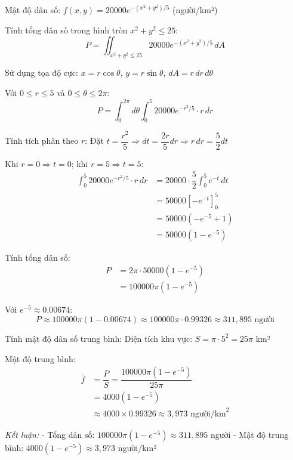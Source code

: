 \begin{solution}
Mật độ dân số: $f(x, y) = 20000e^{-(x^2+y^2)/5}$ (người/km²)

\textit{} Tính tổng dân số trong hình tròn $x^2 + y^2 \leq 25$:
\[
    P = \iint_{x^2+y^2 \leq 25} 20000e^{-(x^2+y^2)/5} \, dA
\]

\textit{} Sử dụng tọa độ cực:
$x = r\cos\theta$, $y = r\sin\theta$, $dA = r \, dr \, d\theta$

Với $0 \leq r \leq 5$ và $0 \leq \theta \leq 2\pi$:
\[
    P = \int_0^{2\pi} d\theta \int_0^5 20000e^{-r^2/5} \cdot r \, dr
\]

\textit{} Tính tích phân theo $r$:
Đặt $t = \dfrac{r^2}{5} \Rightarrow dt = \dfrac{2r}{5} dr \Rightarrow r \, dr = \dfrac{5}{2} dt$

Khi $r = 0 \Rightarrow t = 0$; khi $r = 5 \Rightarrow t = 5$:
\begin{align*}
    \int_0^5 20000e^{-r^2/5} \cdot r \, dr &= 20000 \cdot \dfrac{5}{2} \int_0^5 e^{-t} \, dt \\
    &= 50000 \left[ -e^{-t} \right]_0^5 \\
    &= 50000(-e^{-5} + 1) \\
    &= 50000(1 - e^{-5})
\end{align*}

\textit{} Tính tổng dân số:
\begin{align*}
    P &= 2\pi \cdot 50000(1 - e^{-5}) \\
    &= 100000\pi(1 - e^{-5})
\end{align*}

Với $e^{-5} \approx 0.00674$:
\[
    P \approx 100000\pi(1 - 0.00674) \approx 100000\pi \cdot 0.99326 \approx 311,895 \text{ người}
\]

\textit{} Tính mật độ dân số trung bình:
Diện tích khu vực: $S = \pi \cdot 5^2 = 25\pi$ km²

Mật độ trung bình:
\begin{align*}
    \bar{f} &= \dfrac{P}{S} = \dfrac{100000\pi(1 - e^{-5})}{25\pi} \\
    &= 4000(1 - e^{-5}) \\
    &\approx 4000 \times 0.99326 \approx 3,973 \text{ người/km}^2
\end{align*}

\textit{Kết luận:}
- Tổng dân số: $100000\pi(1 - e^{-5}) \approx 311,895$ người
- Mật độ trung bình: $4000(1 - e^{-5}) \approx 3,973$ người/km²
\end{solution}

